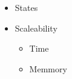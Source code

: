 \documentclass[../../maint.tex]{subfiles}
\begin{document}
\begin{itemize}
	\item States
	\item Scaleability
 	\begin{itemize}
 		\item Time
		\item Memmory
 	\end{itemize}
\end{itemize}
	
\end{document}
